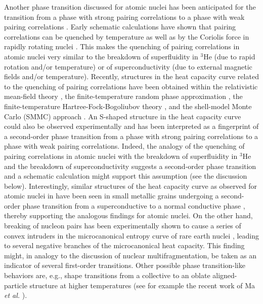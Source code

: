 \documentclass[preprint,rmp,aps,floatfix]{revtex4}
\begin{document}
Another phase transition discussed for atomic nuclei has been anticipated 
for the transition from a phase with strong pairing correlations to a phase 
with weak pairing correlations \cite{SY63}. Early schematic calculations have 
shown that pairing correlations can be quenched by temperature as well as by 
the Coriolis force in rapidly 
rotating nuclei \cite{Go81a,Go81b,TS80,TS82,shimizu89}. 
This makes the quenching of pairing correlations in atomic nuclei very similar 
to the breakdown of superfluidity in $^3$He (due to rapid rotation and/or 
temperature) or of superconductivity (due to external magnetic fields and/or 
temperature). Recently, structures in the heat capacity curve related to the 
quenching of pairing correlations have been obtained within the relativistic 
mean-field theory \cite{AT00,AT01}, the finite-temperature random phase 
approximation \cite{Ng90}, the finite-temperature Hartree-Fock-Bogoliubov 
theory \cite{ER00}, and the shell-model Monte Carlo (SMMC) approach 
\cite{DK95a,NA97,RH98,WK00,liu01}. An S-shaped structure in the heat capacity 
curve could also be observed experimentally \cite{schiller2001} and has been 
interpreted as a fingerprint of a second-order phase transition from a phase 
with strong pairing correlations to a phase with weak pairing correlations. 
Indeed, the analogy of the quenching of pairing correlations in atomic nuclei 
with the breakdown of superfluidity in $^3$He and the breakdown of 
superconductivity suggests a second-order phase transition and a schematic 
calculation might support this assumption (see the discussion below). 
Interestingly, similar 
structures of the heat capacity curve as observed for atomic nuclei in 
\cite{schiller2001} have been seen in 
small metallic grains undergoing a second-order 
phase transition from a superconductive to a normal conductive phase 
\cite{tinkham95,tinkham96,tinkham98,delft2000,LA93}, thereby supporting the analogous findings for atomic nuclei. On 
the other hand, breaking of nucleon pairs has been experimentally shown to 
cause a series of convex intruders in the microcanonical entropy curve of rare 
earth nuclei \cite{oslo3,MG01}, leading to several negative branches of the 
microcanonical heat capacity. 
This finding might, in analogy to the discussion 
of nuclear multifragmentation, be taken as an indicator of several first-order
transitions.
Other possible phase transition-like behaviors are, e.g., shape transitions
from a collective to an oblate aligned-particle structure 
at higher temperatures (see for example the recent work of Ma {\em et al.}
\cite{tenglek2000}).
\end{document}
